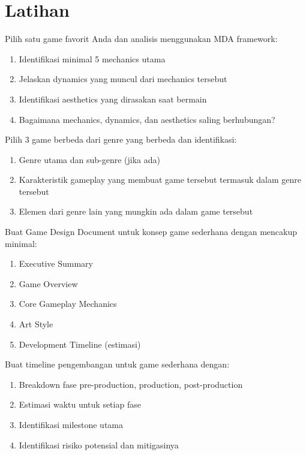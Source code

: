 \section{Latihan}

\begin{latihan}
Pilih satu game favorit Anda dan analisis menggunakan MDA framework:
\begin{enumerate}
\item Identifikasi minimal 5 mechanics utama
\item Jelaskan dynamics yang muncul dari mechanics tersebut
\item Identifikasi aesthetics yang dirasakan saat bermain
\item Bagaimana mechanics, dynamics, dan aesthetics saling berhubungan?
\end{enumerate}
\end{latihan}

\begin{latihan}
Pilih 3 game berbeda dari genre yang berbeda dan identifikasi:
\begin{enumerate}
\item Genre utama dan sub-genre (jika ada)
\item Karakteristik gameplay yang membuat game tersebut termasuk dalam genre tersebut
\item Elemen dari genre lain yang mungkin ada dalam game tersebut
\end{enumerate}
\end{latihan}

\begin{latihan}
Buat Game Design Document untuk konsep game sederhana dengan mencakup minimal:
\begin{enumerate}
\item Executive Summary
\item Game Overview
\item Core Gameplay Mechanics
\item Art Style
\item Development Timeline (estimasi)
\end{enumerate}
\end{latihan}

\begin{latihan}
Buat timeline pengembangan untuk game sederhana dengan:
\begin{enumerate}
\item Breakdown fase pre-production, production, post-production
\item Estimasi waktu untuk setiap fase
\item Identifikasi milestone utama
\item Identifikasi risiko potensial dan mitigasinya
\end{enumerate}
\end{latihan}

